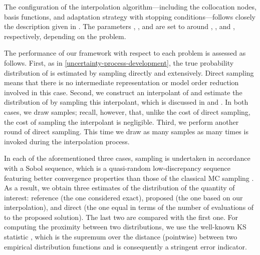 The configuration of the interpolation algorithm---including the collocation
nodes, basis functions, and adaptation strategy with stopping
conditions---follows closely the description given in .
The parameters , , and  are set to around
, , and , respectively, depending on the
problem.

The performance of our framework with respect to each problem is assessed as
follows. First, as in \cref{uncertainty-process-development}, the true
probability distribution of \g is estimated by sampling \g directly and
extensively. Direct sampling means that there is no intermediate representation
or model order reduction involved in this case. Second, we construct an
interpolant of \g and estimate the distribution of \g by sampling this
interpolant, which is discussed in  and
. In both cases, we draw  samples; recall,
however, that, unlike the cost of direct sampling, the cost of sampling the
interpolant is negligible. Third, we perform another round of direct sampling.
This time we draw as many samples as many times \g is invoked during the
interpolation process.

In each of the aforementioned three cases, sampling is undertaken in accordance
with a Sobol sequence, which is a quasi-random low-discrepancy sequence
featuring better convergence properties than those of the classical \ac{MC}
sampling \cite{joe2008}. As a result, we obtain three estimates of the
distribution of the quantity of interest: reference (the one considered exact),
proposed (the one based on our interpolation), and direct (the one equal in
terms of the number of evaluations of \g to the proposed solution). The last two
are compared with the first one. For computing the proximity between two
distributions, we use the well-known \ac{KS} statistic \cite{rao2002}, which is
the supremum over the distance (pointwise) between two empirical distribution
functions and is consequently a stringent error indicator.


